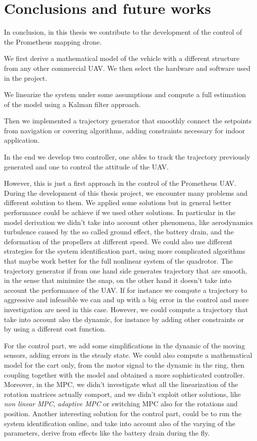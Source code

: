 \chapter{Conclusions and future works}
\label{conclusions}

In conclusion, in this thesis we contribute to the development of the control of the Prometheus mapping drone. 

\noindent We first derive a mathematical model of the vehicle with a different structure from any other commercial UAV. We then select the hardware and software used in the project. 

\noindent We linearize the system under some assumptions and compute a full estimation of the model using a Kalman filter approach.

\noindent Then we implemented a trajectory generator that smoothly connect the setpoints from navigation or covering algorithms, adding constraints necessary for indoor application.

\noindent In the end we develop two controller, one ables to track the trajectory previously generated and one to control the attitude of the UAV.

\noindent However, this is just a first approach in the control of the Prometheus UAV. During the development of this thesis project, we encounter many problems and different solution to them. We applied some solutions but in general better performance could be achieve if we used other solutions. In particular in the model derivation we didn't take into account other phenomena, like aerodynamics turbulence caused by the so called ground effect, the battery drain, and the deformation of the propellers at different speed. We could also use different strategies for the system identification part, using more complicated algorithms that maybe work better for the full nonlinear system of the quadrotor. The trajectory generator if from one hand side generates trajectory that are smooth, in the sense that minimize the snap, on the other hand it doesn't take into account the performance of the UAV. If for instance we compute a trajectory to aggressive and infeasible we can and up with a big error in the control and more investigation are need in this case. However, we could compute a trajectory that take into account also the dynamic, for instance by adding other constraints or by using a different cost function. 

\noindent For the control part,  we add some simplifications in the dynamic of the moving sensors, adding errors in the steady state. We could also compute a mathematical model for the cart only, from the motor signal to the dynamic in the ring, then coupling together with the model and obtained a more sophisticated controller. Moreover, in the MPC, we didn't investigate what all the linearization of the rotation matrices actually comport, and we didn't exploit other solutions, like \textit{non linear MPC}, \textit{adaptive MPC} or switching MPC also for the rotations and position. Another interesting solution for the control part, could be to run the system identification online, and take into account also of the varying of the parameters, derive from effects like the battery drain during the fly.
